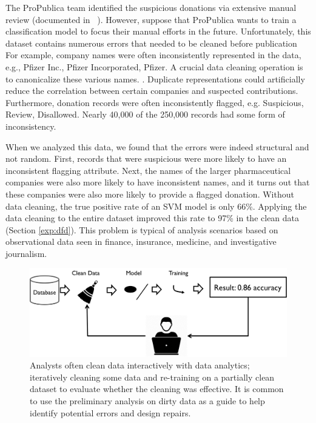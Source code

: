
The ProPublica team identified the suspicious donations via extensive manual review (documented in ~\cite{dollarsfordocs}).
However, suppose that ProPublica wants to train a classification model to focus their manual efforts in the future.
Unfortunately, this dataset contains numerous errors that needed to be cleaned before publication
For example, company names were often inconsistently represented in the data, e.g., Pfizer Inc., Pfizer Incorporated, Pfizer.
A crucial data cleaning operation is to canonicalize these various names.
.
Duplicate representations could artificially reduce the correlation between certain companies and suspected contributions.
Furthermore, donation records were often inconsistently flagged, e.g. Suspicious, Review, Disallowed.
Nearly 40,000 of the 250,000 records had some form of inconsistency.

When we analyzed this data, we found that the errors were indeed structural and not random.  %
First, records that were suspicious were more likely to have an inconsistent flagging attribute.
Next, the names of the larger pharmaceutical companies were also more likely to have inconsistent names, and it turns out that these companies were also more likely to provide a flagged donation.
Without data cleaning, the true positive rate of an SVM model is only 66\%.
Applying the data cleaning to the entire dataset improved this rate to 97\% in the clean data (Section \ref{exp:dfd}).
This problem is typical of analysis scenarios based on observational data seen in finance, insurance, medicine, and investigative journalism.


\begin{figure}[t]
\centering
 \includegraphics[width=0.8\columnwidth]{figs/workflow.png}
 \caption{Analysts often clean data interactively with data analytics; iteratively cleaning some data and re-training on a partially clean dataset to evaluate whether the cleaning was effective. It is common to use the preliminary analysis on dirty data as a guide to help identify potential errors and design repairs. \label{cartoon}}
\end{figure}

